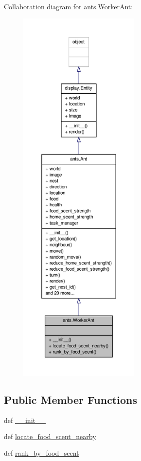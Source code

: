 Collaboration diagram for ants.\+Worker\+Ant\+:
\nopagebreak
\begin{figure}[H]
\begin{center}
\leavevmode
\includegraphics[height=550pt]{classants_1_1WorkerAnt__coll__graph}
\end{center}
\end{figure}
\subsection*{Public Member Functions}
\begin{DoxyCompactItemize}
\item 
def \hyperlink{classants_1_1WorkerAnt_a82e7d37f66c81e029cad6038d6515056}{\+\_\+\+\_\+init\+\_\+\+\_\+}
\item 
def \hyperlink{classants_1_1WorkerAnt_a3a0836d96b5fe9eba56e9d2d59b555cc}{locate\+\_\+food\+\_\+scent\+\_\+nearby}
\item 
def \hyperlink{classants_1_1WorkerAnt_a65ef16439f2ff5d217e1e443d57b65d1}{rank\+\_\+by\+\_\+food\+\_\+scent}
\end{DoxyCompactItemize}
